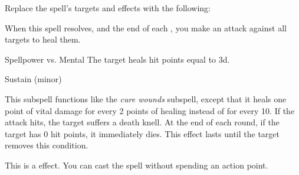 Replace the spell's targets and effects with the following:
\begin{spellcontent}
\begin{augmenttargetinginfo}
\end{augmenttargetinginfo}
\begin{augmenteffects}
\spelleffect
When this spell resolves, and the end of each , you make an attack against all targets to heal them.
\begin{spellattack}{Spellpower vs. Mental}
\spellsuccess
The target heals hit points equal to  \minus3d.
\end{spellattack}
\spelldur Sustain (minor)
\end{augmenteffects}
\end{spellcontent}
This subspell functions like the \textit{cure wounds} subspell, except that it heals one point of vital damage for every 2 points of healing instead of for every 10.
If the attack hits, the target suffers a death knell.
At the end of each round, if the target has 0 hit points, it immediately dies.
This effect lasts until the target removes this condition.
\par
This is a  effect.
You can cast the spell without spending an action point.